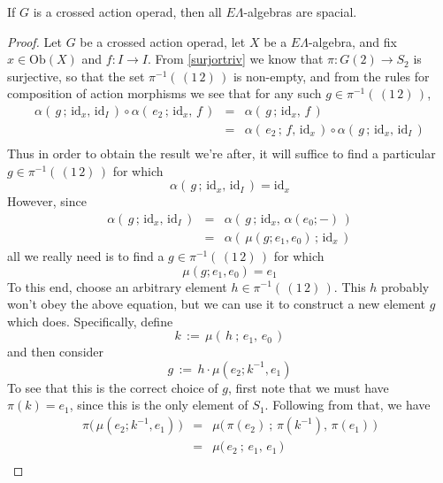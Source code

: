 \documentclass{amsbook} %
\numberwithin{section}{chapter}
\begin{document}
\begin{lem}\label{spacial} If $G$ is a crossed action operad, then all $E\Lambda$-algebras are spacial. \end{lem}
\begin{proof}
Let $G$ be a crossed action operad, let $X$ be a $E\Lambda$-algebra, and fix $x \in \mathrm{Ob}(X)$ and \( f: I \to I \). From \cref{surjortriv} we know that \( \pi : G(2) \to S_2 \) is surjective, so that the set $\pi^{-1}( \, (1 \, 2) \, )$ is non-empty, and from the rules for composition of action morphisms we see that for any such $g \in \pi^{-1}( \, (1 \, 2) \, )$,
\[\begin{array}{rll}
		\alpha( \, g \, ; \, \mathrm{id}_x, \, \mathrm{id}_I \, ) \circ \alpha( \, e_2 \, ; \, \mathrm{id}_x, \, f \, ) & = & \alpha( \, g \, ; \, \mathrm{id}_x, \, f \, ) \\
		& = & \alpha( \, e_2 \, ; \, f, \, \mathrm{id}_x \, ) \circ \alpha( \, g \, ; \, \mathrm{id}_x, \, \mathrm{id}_I \, ) \\
		\end{array}
\]
Thus in order to obtain the result we're after, it will suffice to find a particular $g \in \pi^{-1}( \, (1 \, 2) \, )$ for which
\[\alpha( \, g \, ; \, \mathrm{id}_x, \, \mathrm{id}_I \, ) = \mathrm{id}_x \]
However, since
\[\begin{array}{rll}
		\alpha( \, g \, ; \, \mathrm{id}_x, \, \mathrm{id}_I \, ) & = & \alpha( \, g \, ; \, \mathrm{id}_x, \, \alpha( e_0; - ) \, ) \\
		& = & \alpha( \, \mu(g; e_1, e_0) \, ; \, \mathrm{id}_x \, )
		\end{array}
\]
all we really need is to find a $g \in \pi^{-1}( \, (1 \, 2) \, )$ for which
\[ \mu(g; e_1, e_0) = e_1 \]
To this end, choose an arbitrary element $h \in \pi^{-1}( \, (1 \, 2) \, )$. This $h$ probably won't obey the above equation, but we can use it to construct a new element $g$ which does. Specifically, define
\[ k \, := \, \mu( \, h \ ; \, e_1, \, e_0 \, ) \]
and then consider
\[ g \, := \, h \cdot \mu(e_2; k^{-1}, e_1) \] 
To see that this is the correct choice of $g$, first note that we must have \( \pi(k) = e_1 \), since this is the only element of $S_1$. Following from that, we have 
\[\begin{array}{rll}
		\pi \big( \, \mu(e_2; k^{-1}, e_1) \, \big) & = & \mu \big( \, \pi(e_2) \ ; \, \pi(k^{-1}), \, \pi(e_1) \, \big) \\
		& = & \mu \big( \, e_2  \ ; \, e_1, \, e_1 \, \big) \\

\end{array}\]
\end{proof}
\end{document}

